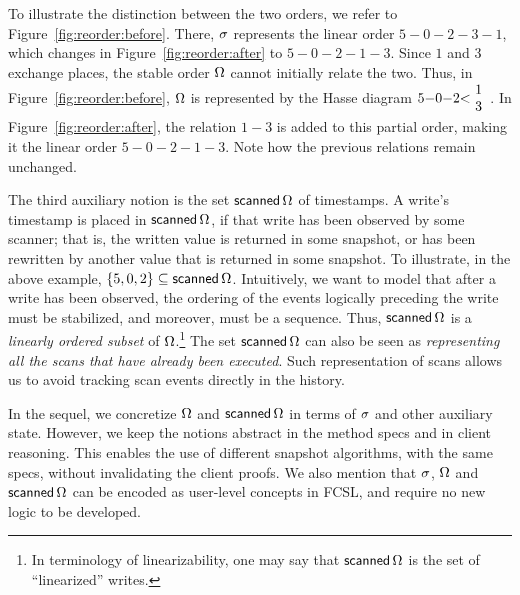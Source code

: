 %

To illustrate the distinction between the two orders, we refer to
Figure~\ref{fig:reorder:before}. There, $\sigma$ represents the
linear order $5{-}0{-}2{-}3{-}1$, which changes in
Figure~\ref{fig:reorder:after} to $5{-}0{-}2{-}1{-}3$.
%
Since $1$ and $3$ exchange places, the stable order $\Omega$
cannot initially relate the two. Thus, in
Figure~\ref{fig:reorder:before}, $\Omega$ is represented by the
Hasse diagram $5{-}0{-}2{<}\!\begin{array}[c]{c}1\\ 3\end{array}$. In
Figure~\ref{fig:reorder:after}, the relation $1{-}3$ is added to this
partial order, making it the linear order $5{-}0{-}2{-}1{-}3$. Note
how the previous relations remain unchanged.

\newcommand{\scanned}[1]{\mathsf{scanned}\,#1}

The third auxiliary notion is the set $\scanned\stableorder$ of
timestamps. A write's timestamp is placed in $\scanned\stableorder$,
if that write has been observed by some scanner; that is, the written
value is returned in some snapshot, or has been rewritten by another
value that is returned in some snapshot. To illustrate, in the above
example, $\{5, 0, 2\} \subseteq \scanned\stableorder$.  Intuitively,
we want to model that after a write has been observed, the ordering of
the events logically preceding the write must be stabilized, and
moreover, must be a sequence. Thus,
$\scanned\stableorder$ is a \emph{linearly ordered subset} of
$\Omega$.\footnote{In terminology of linearizability, one may
  say that $\scanned\stableorder$ is the set of ``linearized''
  writes.}  The set $\scanned\stableorder$ can also be seen as
\emph{representing all the scans that have already been
  executed}. Such representation of scans allows us to avoid tracking
scan events directly in the history.

In the sequel, we concretize $\Omega$ and
$\scanned\stableorder$ in terms of $\sigma$ and other auxiliary
state. However, we keep the notions abstract in the method specs and
in client reasoning. This enables the use of different snapshot
algorithms, with the same specs, without invalidating the client
proofs. We also mention that $\sigma$, $\Omega$ and
$\scanned\stableorder$ can be encoded as user-level concepts in FCSL,
and require no new logic to be developed.

